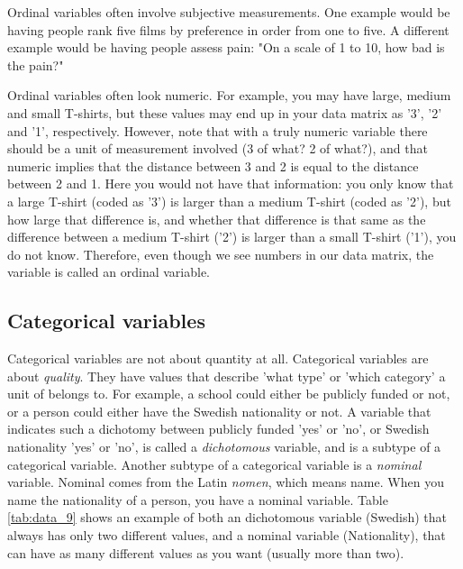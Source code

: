 Ordinal variables often involve subjective measurements. One example would be having people rank five films by preference in order from one to five. A different example would be having people assess pain: "On a scale of 1 to 10, how bad is the pain?"

Ordinal variables often look numeric. For example, you may have large, medium and small T-shirts, but these values may end up in your data matrix as '3', '2' and '1', respectively. However, note that with a truly numeric variable there should be a unit of measurement involved (3 of what? 2 of what?), and that numeric implies that the distance between 3 and 2 is equal to the distance between 2 and 1. Here you would not have that information: you only know that a large T-shirt (coded as '3') is larger than a medium T-shirt (coded as '2'), but how large that difference is, and whether that difference is that same as the difference between a medium T-shirt ('2') is larger than a small T-shirt ('1'), you do not know. Therefore, even though we see numbers in our data matrix, the variable is called an ordinal variable. 


\subsection{Categorical variables}

Categorical variables are not about quantity at all. Categorical variables are about \textit{quality}. They have values that describe 'what type' or 'which category' a unit of belongs to. For example, a school could either be publicly funded or not, or a person could either have the Swedish nationality or not. A variable that indicates such a dichotomy between publicly funded 'yes' or 'no', or Swedish nationality 'yes' or 'no', is called a \textit{dichotomous} variable, and is a subtype of a categorical variable. Another subtype of a categorical variable is a \textit{nominal} variable. Nominal comes from the Latin \textit{nomen}, which means name. When you name the nationality of a person, you have a nominal variable. Table \ref{tab:data_9} shows an example of both an dichotomous variable (Swedish) that always has only two different values, and a nominal variable (Nationality), that can have as many different values as you want (usually more than two).



\begin{kframe}


{\ttfamily\noindent\bfseries{}}\end{kframe}

